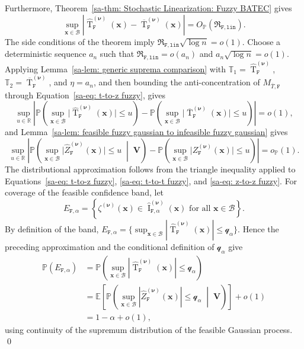 \documentclass[10pt]{article}
\DeclareMathOperator{\Tstat}{T}
\DeclareMathOperator{\CI}{I}
\renewcommand{\P}{\mathbb{P}}
\newcommand{\E}{\mathbb{E}}
\newcommand{\reals}{\mathbb{R}}
\newcommand{\bV}{\mathbf{V}}
\newcommand{\bx}{\mathbf{x}}
\newcommand{\bnu}{\boldsymbol{\nu}}
\newcommand{\B}{\mathcal{B}}
\newcommand{\q}{\mathcal{q}}
\begin{document}
Furthermore, Theorem~\ref{sa-thm: Stochastic Linearization: Fuzzy BATEC} gives
\[
    \sup_{\bx\in\B}
    |\widehat{\Tstat}_{\mathtt{F}}^{(\bnu)}(\bx)
    -\overline{\Tstat}_{\mathtt{F}}^{(\bnu)}(\bx)|
    =
    O_{\P}(\mathfrak{R}_{\mathtt{F,lin}}).
\]
The side conditions of the theorem imply $\mathfrak{R}_{\mathtt{F,lin}}\sqrt{\log n}=o(1)$. Choose a deterministic sequence $a_n$ such that $\mathfrak{R}_{\mathtt{F,lin}}=o(a_n)$ and $a_n\sqrt{\log n}=o(1)$. Applying Lemma~\ref{sa-lem: generic suprema comparison} with $\mathbb{T}_1=\widehat{\Tstat}_{\mathtt{F}}^{(\bnu)}$, $\mathbb{T}_2=\overline{\Tstat}_{\mathtt{F}}^{(\bnu)}$, and $\eta=a_n$, and then bounding the anti-concentration of $M_{\overline T,\mathtt{F}}$ through Equation~\eqref{sa-eq: t-to-z fuzzy}, gives
\begin{equation}\label{sa-eq: t-to-t fuzzy}
    \sup_{u \in \reals} \left| \P \left( \sup_{\bx \in \B} \big| \widehat{\Tstat}_{\mathtt{F}}^{(\bnu)}(\bx) \big| \leq u \right) - \P \left( \sup_{\bx \in \B} \big| \overline{\Tstat}_{\mathtt{F}}^{(\bnu)}(\bx) \big| \leq u \right) \right| = o(1),
\end{equation}
and Lemma~\ref{sa-lem: feasible fuzzy gaussian to infeasible fuzzy gaussian} gives
\begin{equation}\label{sa-eq: z-to-z fuzzy}
    \sup_{u \in \reals} \left| \P \left( \sup_{\bx \in \B} \big| \widehat{Z}_{\mathtt{F}}^{(\bnu)}(\bx) \big| \leq u \;\middle|\; \bV \right) - \P \left( \sup_{\bx \in \B} \big| Z_{\mathtt{F}}^{(\bnu)}(\bx) \big| \leq u \right) \right| = o_{\P}(1).
\end{equation}
The distributional approximation follows from the triangle inequality applied to Equations~\eqref{sa-eq: t-to-z fuzzy}, \eqref{sa-eq: t-to-t fuzzy}, and \eqref{sa-eq: z-to-z fuzzy}. For coverage of the feasible confidence band, let
\[
    E_{\mathtt{F},\alpha}
    =
    \left\{
    \zeta^{(\bnu)}(\bx)\in\widehat{\CI}_{\mathtt{F},\alpha}^{(\bnu)}(\bx)
    \text{ for all }\bx\in\B
    \right\}.
\]
By definition of the band, $E_{\mathtt{F},\alpha}=\{\sup_{\bx\in\B}|\widehat{\Tstat}_{\mathtt{F}}^{(\bnu)}(\bx)|\leq \q_\alpha\}$. Hence the preceding approximation and the conditional definition of $\q_\alpha$ give
\begin{align*}
    \P(E_{\mathtt{F},\alpha})
    &= \P\left(\sup_{\bx\in\B}|\widehat{\Tstat}_{\mathtt{F}}^{(\bnu)}(\bx)|\leq \q_\alpha\right)\\
    &= \E\left[
        \P\left(\sup_{\bx\in\B}|\widehat Z_{\mathtt{F}}^{(\bnu)}(\bx)|\leq \q_\alpha\;\middle|\;\bV\right)
       \right]+o(1)\\
    &= 1-\alpha+o(1),
\end{align*}
using continuity of the supremum distribution of the feasible Gaussian process.
\qed
\end{document}
